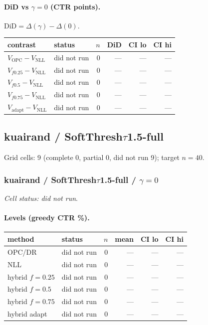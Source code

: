 \documentclass[10pt,a4paper]{article}
\begin{document}
\paragraph{DiD vs $\gamma=0$ (CTR points).} $\mathrm{DiD}=\Delta(\gamma)-\Delta(0)$.
{\centering\small\begin{tabular}{llrrrr}
\toprule contrast & status & $n$ & DiD & CI lo & CI hi \\
\midrule
$V_{\mathrm{OPC}}-V_{\mathrm{NLL}}$ & did not run & 0 & --- & --- & --- \\
$V_{f0.25}-V_{\mathrm{NLL}}$ & did not run & 0 & --- & --- & --- \\
$V_{f0.5}-V_{\mathrm{NLL}}$ & did not run & 0 & --- & --- & --- \\
$V_{f0.75}-V_{\mathrm{NLL}}$ & did not run & 0 & --- & --- & --- \\
$V_{\mathrm{adapt}}-V_{\mathrm{NLL}}$ & did not run & 0 & --- & --- & --- \\
\bottomrule\end{tabular}\par}
\bigskip
\newpage
\subsection{kuairand / SoftThresh$\tau$1.5-full}
Grid cells: 9 (complete 0, partial 0, did not run 9); target $n=40$.
\subsubsection{kuairand / SoftThresh$\tau$1.5-full / $\gamma=0$}
\emph{Cell status: did not run}.
\paragraph{Levels (greedy CTR \%).}
{\centering\small\begin{tabular}{llrrrr}
\toprule method & status & $n$ & mean & CI lo & CI hi \\
\midrule
OPC/DR & did not run & 0 & --- & --- & --- \\
NLL & did not run & 0 & --- & --- & --- \\
hybrid $f{=}0.25$ & did not run & 0 & --- & --- & --- \\
hybrid $f{=}0.5$ & did not run & 0 & --- & --- & --- \\
hybrid $f{=}0.75$ & did not run & 0 & --- & --- & --- \\
hybrid adapt & did not run & 0 & --- & --- & --- \\
\bottomrule\end{tabular}\par}
\end{document}
